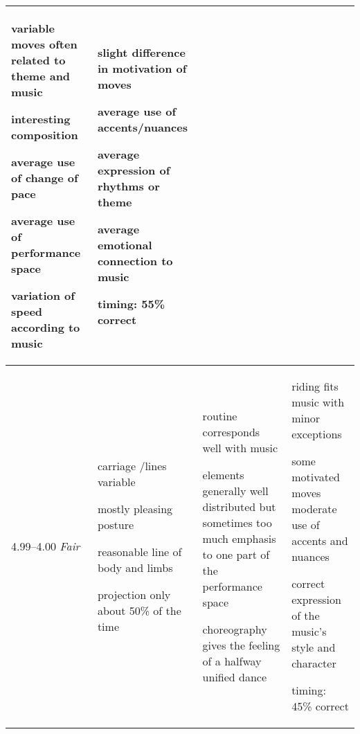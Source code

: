 \begin{longtable}{|p{1.5cm}|p{5.5cm}|p{5.5cm}|p{5.5cm}|}
\begin{judging_items}%
\item variable moves often related to theme and music
\item interesting composition
\item average use of change of pace
\item average use of performance space
\item variation of speed according to music
\end{judging_items} &

\begin{judging_items}%
\item slight difference in motivation of moves
\item average use of accents/nuances
\item average expression of rhythms or theme
\item average emotional connection to music
\item timing: 55\% correct 
\end{judging_items} \\
\hline

4.99--4.00 \newline
\emph{Fair} &

\begin{judging_items}%
\item carriage /lines variable 
\item mostly pleasing posture
\item reasonable line of body and limbs
\item projection only about 50\% of the time
\end{judging_items} &

\begin{judging_items}%
\item routine corresponds well with music
\item elements generally well distributed but sometimes too much emphasis to one part of the performance space
\item choreography gives the feeling of a halfway unified dance
\end{judging_items} &

\begin{judging_items}%
\item riding fits music with minor exceptions
\item some motivated moves moderate use of accents and nuances
\item correct expression of the music's style and character
\item timing: 45\% correct 
\end{judging_items} \\
\hline


\end{longtable}
